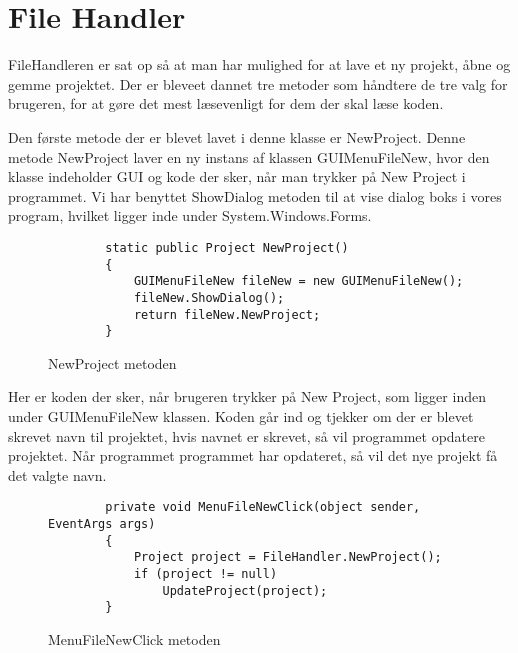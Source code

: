 \section{File Handler}\label{FileHandler}

FileHandleren er sat op så at man har mulighed for at lave et ny projekt, åbne og gemme projektet. Der er bleveet dannet tre metoder som håndtere de tre valg for brugeren, for at gøre det mest læsevenligt for dem der skal læse koden.

\vspace{5mm}

Den første metode der er blevet lavet i denne klasse er NewProject. Denne metode NewProject laver en ny instans af klassen GUIMenuFileNew, hvor den klasse indeholder GUI og kode der sker, når man trykker på New Project i programmet. Vi har benyttet ShowDialog metoden til at vise dialog boks i vores program, hvilket ligger inde under System.Windows.Forms.

\begin{figure}[H]
\begin{lstlisting}
 		static public Project NewProject()
        {
            GUIMenuFileNew fileNew = new GUIMenuFileNew();
            fileNew.ShowDialog();
            return fileNew.NewProject;
        }
\end{lstlisting}
\caption{NewProject metoden}\label{NewProjectCode}
\end{figure}

\vspace{5mm}

Her er koden der sker, når brugeren trykker på New Project, som ligger inden under GUIMenuFileNew klassen. Koden går ind og tjekker om der er blevet skrevet navn til projektet, hvis navnet er skrevet, så vil programmet opdatere projektet. Når programmet programmet har opdateret, så vil det nye projekt få det valgte navn.

\begin{figure}[H]
\begin{lstlisting}
        private void MenuFileNewClick(object sender, EventArgs args)
        {
            Project project = FileHandler.NewProject();
            if (project != null)
                UpdateProject(project);
        }
\end{lstlisting}
\caption{MenuFileNewClick metoden}\label{MenuFileNewClickCode}
\end{figure}

\vspace{5mm}

